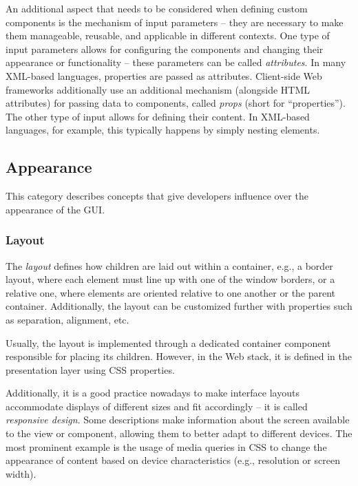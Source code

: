 An additional aspect that needs to be considered when defining custom components is the mechanism of input parameters -- they are necessary to make them manageable, reusable, and applicable in different contexts.
One type of input parameters allows for configuring the components and changing their appearance or functionality -- these parameters can be called \emph{attributes}.
In many XML-based languages, properties are passed as attributes.
Client-side Web frameworks additionally use an additional mechanism (alongside HTML attributes) for passing data to components, called \emph{props} (short for \enquote{properties}).
The other type of input allows for defining their content.
In XML-based languages, for example, this typically happens by simply nesting elements.

\subsection{Appearance}\label{subsec:appearance}
This category describes concepts that give developers influence over the appearance of the GUI\@.

\subsubsection{Layout}
The \emph{layout} defines how children are laid out within a container, e.g., a border layout, where each element must line up with one of the window borders, or a relative one, where elements are oriented relative to one another or the parent container.
Additionally, the layout can be customized further with properties such as separation, alignment, etc.

Usually, the layout is implemented through a dedicated container component responsible for placing its children.
However, in the Web stack, it is defined in the presentation layer using CSS properties.

Additionally, it is a good practice nowadays to make interface layouts accommodate displays of different sizes and fit accordingly -- it is called \emph{responsive design}.
Some descriptions make information about the screen available to the view or component, allowing them to better adapt to different devices.
The most prominent example is the usage of media queries in CSS to change the appearance of content based on device characteristics (e.g., resolution or screen width).

